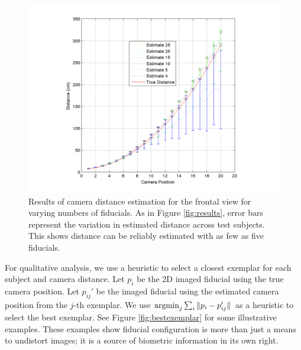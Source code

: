 \documentclass[runningheads]{llncs}
\newcommand{\argmin}{\operatornamewithlimits{argmin}}
\newcommand {\afbnote} [1] {{\bf \textcolor{red}{(#1)}}}
\begin{document}
\begin{figure}[h]
\centering
\includegraphics[width=1\linewidth]{resources/figures/errorbar_frontal_lessfiducials.png}
\caption{
Results of camera distance estimation for the frontal view for varying numbers of fiducials.
As in Figure \ref{fig:results}, error bars represent the variation in estimated distance across test subjects.
This shows distance can be reliably estimated with as few as five fiducials.
}
\label{fig:error_bar_frontal_lessfiducials}
\end{figure}

For qualitative analysis, we use a heuristic to select a closest exemplar for each subject and camera distance.  
Let $p_i$ be the 2D imaged fiducial using the true camera position.  
Let $p_{ij}'$ be the imaged fiducial using the estimated camera position from the $j$-th exemplar.
We use $\argmin_j \sum_i \|p_i - p_{ij}'\|$ as a heuristic to select the best exemplar. 
See Figure \ref{fig:bestexemplar} for some illustrative examples.
These examples show fiducial configuration is more than just a means to undistort images; it is a source of biometric information in its own right.
\end{document}
